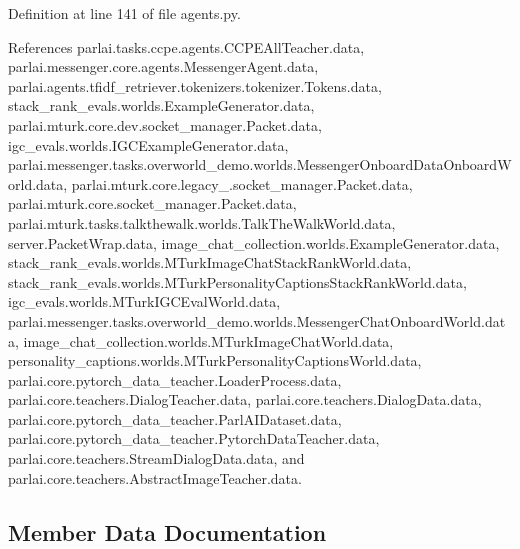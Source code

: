 Definition at line 141 of file agents.\+py.



References parlai.\+tasks.\+ccpe.\+agents.\+C\+C\+P\+E\+All\+Teacher.\+data, parlai.\+messenger.\+core.\+agents.\+Messenger\+Agent.\+data, parlai.\+agents.\+tfidf\+\_\+retriever.\+tokenizers.\+tokenizer.\+Tokens.\+data, stack\+\_\+rank\+\_\+evals.\+worlds.\+Example\+Generator.\+data, parlai.\+mturk.\+core.\+dev.\+socket\+\_\+manager.\+Packet.\+data, igc\+\_\+evals.\+worlds.\+I\+G\+C\+Example\+Generator.\+data, parlai.\+messenger.\+tasks.\+overworld\+\_\+demo.\+worlds.\+Messenger\+Onboard\+Data\+Onboard\+World.\+data, parlai.\+mturk.\+core.\+legacy\+\_.\+socket\+\_\+manager.\+Packet.\+data, parlai.\+mturk.\+core.\+socket\+\_\+manager.\+Packet.\+data, parlai.\+mturk.\+tasks.\+talkthewalk.\+worlds.\+Talk\+The\+Walk\+World.\+data, server.\+Packet\+Wrap.\+data, image\+\_\+chat\+\_\+collection.\+worlds.\+Example\+Generator.\+data, stack\+\_\+rank\+\_\+evals.\+worlds.\+M\+Turk\+Image\+Chat\+Stack\+Rank\+World.\+data, stack\+\_\+rank\+\_\+evals.\+worlds.\+M\+Turk\+Personality\+Captions\+Stack\+Rank\+World.\+data, igc\+\_\+evals.\+worlds.\+M\+Turk\+I\+G\+C\+Eval\+World.\+data, parlai.\+messenger.\+tasks.\+overworld\+\_\+demo.\+worlds.\+Messenger\+Chat\+Onboard\+World.\+data, image\+\_\+chat\+\_\+collection.\+worlds.\+M\+Turk\+Image\+Chat\+World.\+data, personality\+\_\+captions.\+worlds.\+M\+Turk\+Personality\+Captions\+World.\+data, parlai.\+core.\+pytorch\+\_\+data\+\_\+teacher.\+Loader\+Process.\+data, parlai.\+core.\+teachers.\+Dialog\+Teacher.\+data, parlai.\+core.\+teachers.\+Dialog\+Data.\+data, parlai.\+core.\+pytorch\+\_\+data\+\_\+teacher.\+Parl\+A\+I\+Dataset.\+data, parlai.\+core.\+pytorch\+\_\+data\+\_\+teacher.\+Pytorch\+Data\+Teacher.\+data, parlai.\+core.\+teachers.\+Stream\+Dialog\+Data.\+data, and parlai.\+core.\+teachers.\+Abstract\+Image\+Teacher.\+data.



\subsection{Member Data Documentation}
\mbox{\label{classparlai_1_1tasks_1_1ccpe_1_1agents_1_1CCPEAllTeacher_a87116ac748a76cceda5a74869e330a1e}} 
